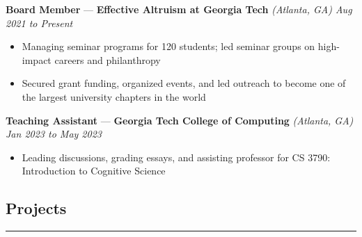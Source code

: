 \documentclass[10pt]{article}
\newcommand{\resumeHeading}[1]{
    \subsection*{#1}
    \hrule
    \vspace*{5pt}
}
\newcommand{\resumeSubHeading}[4]{
    \vspace*{5pt}
    \textbf{#1} — \textbf{#2} \textsl{(#3) \hfill #4}
}
\begin{document}
\resumeSubHeading
    {Board Member}
    {Effective Altruism at Georgia Tech}
    {Atlanta, GA}
    {Aug 2021 to Present}
\begin{itemize}
    \item Managing seminar programs for 120 students; led seminar groups on high-impact careers and philanthropy
    \item Secured grant funding, organized events, and led outreach to become one of the largest university chapters in the world
\end{itemize}

\resumeSubHeading
    {Teaching Assistant}
    {Georgia Tech College of Computing}
    {Atlanta, GA}
    {Jan 2023 to May 2023}
\begin{itemize}
    \item Leading discussions, grading essays, and assisting professor for CS 3790: Introduction to Cognitive Science
\end{itemize}



\resumeHeading{Projects \vspace{-2.5pt}}



    
\end{document}
